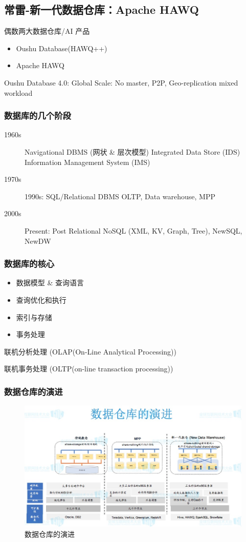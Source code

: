 \documentclass[hyperref, UTF-8]{ctexart}
\begin{document}
\subsection{常雷-新一代数据仓库：Apache HAWQ}
\label{sec:org0103c26}
\label{org5ae5bde}
 偶数两大数据仓库/AI 产品  
\begin{itemize}
\item Oushu Database(HAWQ++)
\item Apache HAWQ
\end{itemize}
Oushu Database 4.0: Global Scale: No master, P2P, Geo-replication mixed workload
\subsubsection{数据库的几个阶段}
\label{sec:orgfccc3aa}
\begin{description}
\item[{1960s}] Navigational DBMS (网状 \& 层次模型)
Integrated Data Store (IDS)
Information Management System (IMS)
\item[{1970s}] 1990s: SQL/Relational DBMS
OLTP, Data warehouse, MPP
\item[{2000s}] Present: Post Relational
NoSQL (XML, KV, Graph, Tree), NewSQL, NewDW
\end{description}
\subsubsection{数据库的核心}
\label{sec:org1325250}
\begin{itemize}
\item 数据模型 \& 查询语言
\item 查询优化和执行
\item 索引与存储
\item 事务处理
\end{itemize}
联机分析处理 (OLAP(On-Line Analytical Processing))

联机事务处理 (OLTP(on-line transaction processing))
\subsubsection{数据仓库的演进}
\label{sec:orgbc97b96}
\begin{figure}[htbp]
\centering
\includegraphics[width=.9\linewidth]{PPTNote/Jietu20171129-133840_2017-11-29_13-38-47.jpg}
\caption{数据仓库的演进}
\end{figure}
\end{document}
